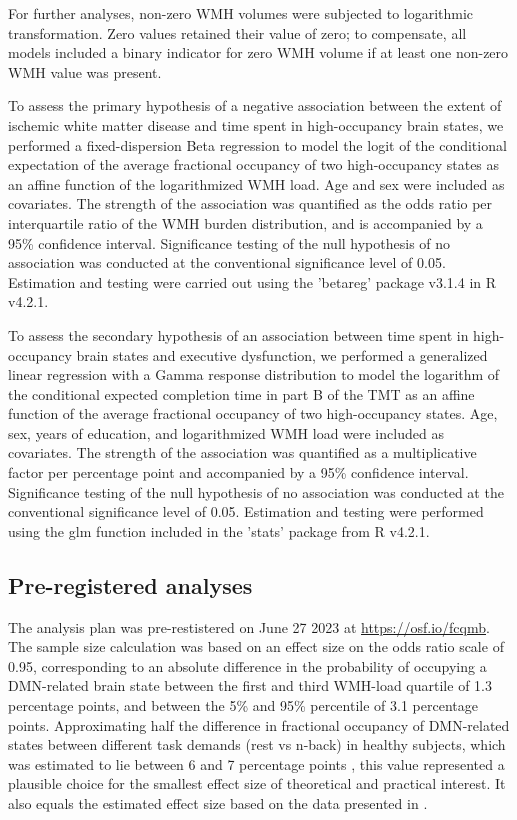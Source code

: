 For further analyses, non-zero WMH volumes were subjected to logarithmic transformation.
Zero values retained their value of zero; to compensate, all models included a binary indicator for zero WMH volume if at least one non-zero WMH value was present.

To assess the primary hypothesis of a negative association between the extent of ischemic white matter disease and time spent in high-occupancy brain states, we performed a fixed-dispersion Beta regression to model the logit of the conditional expectation of the average fractional occupancy of two high-occupancy states as an affine function of the logarithmized WMH load.
Age and sex were included as covariates.
The strength of the association was quantified as the odds ratio per interquartile ratio of the WMH burden distribution, and is accompanied by a 95\% confidence interval.
Significance testing of the null hypothesis of no association was conducted at the conventional significance level of 0.05.
Estimation and testing were carried out using the 'betareg' package v3.1.4 in R v4.2.1.

To  assess the secondary hypothesis of an association between time spent in high-occupancy brain states and executive dysfunction, we performed a generalized linear regression with a Gamma response distribution to model the logarithm of the conditional expected completion time in part B of the TMT as an affine function of the average fractional occupancy of two high-occupancy states.
Age, sex, years of education, and logarithmized WMH load were included as covariates.
The strength of the association was quantified as a multiplicative factor per percentage point and accompanied by a 95\% confidence interval.
Significance testing of the null hypothesis of no association was conducted at the conventional significance level of 0.05.
Estimation and testing were performed using the glm function included in the 'stats' package from R v4.2.1.

\subsection{Pre-registered analyses}
The analysis plan was pre-restistered on June 27 2023 at \url{https://osf.io/fcqmb}. The sample size calculation was based on an effect size on the odds ratio scale of 0.95, corresponding to an absolute difference in the probability of occupying a DMN-related brain state between the first and third WMH-load quartile of 1.3 percentage points, and between the 5\% and 95\% percentile of 3.1 percentage points. Approximating half the difference in fractional occupancy of DMN-related states between different task demands (rest vs n-back) in healthy subjects, which was estimated to lie between 6 and 7 percentage points \citep{Cornblath2020-fu}, this value represented a plausible choice for the smallest effect size of theoretical and practical interest. It also equals the estimated effect size based on the data presented in \citep{Schlemm2022-he}.

